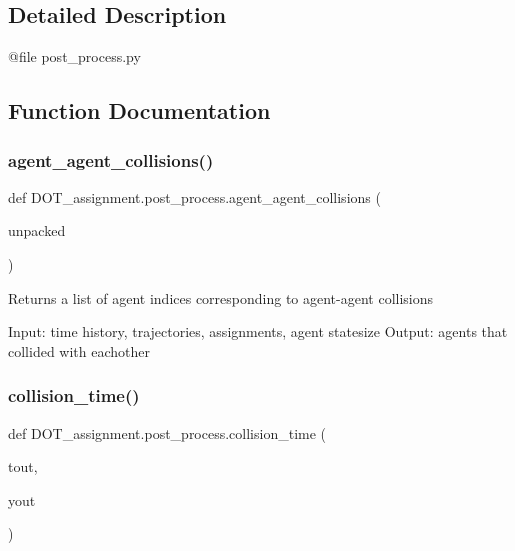\subsection{Detailed Description}
\begin{DoxyVerb}@file post_process.py
\end{DoxyVerb}
 

\subsection{Function Documentation}
\mbox{\label{namespace_d_o_t__assignment_1_1post__process_a288aa587d8918d98b8bda5af6ace1dbe}} 
\subsubsection{\texorpdfstring{agent\_agent\_collisions()}{agent\_agent\_collisions()}}
{\footnotesize\ttfamily def D\+O\+T\+\_\+assignment.\+post\+\_\+process.\+agent\+\_\+agent\+\_\+collisions (\begin{DoxyParamCaption}\item[{}]{unpacked }\end{DoxyParamCaption})}

\begin{DoxyVerb}Returns a list of agent indices corresponding to agent-agent collisions

Input: time history, trajectories, assignments, agent statesize
Output: agents that collided with eachother\end{DoxyVerb}
 \mbox{\label{namespace_d_o_t__assignment_1_1post__process_a236c6a12b67e46887df627b9eb3b7238}} 
\subsubsection{\texorpdfstring{collision\_time()}{collision\_time()}}
{\footnotesize\ttfamily def D\+O\+T\+\_\+assignment.\+post\+\_\+process.\+collision\+\_\+time (\begin{DoxyParamCaption}\item[{}]{tout,  }\item[{}]{yout }\end{DoxyParamCaption})}

